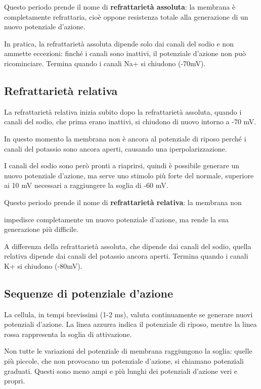 \documentclass[12pt,a4paper,openany]{book}
\begin{document}
Questo periodo prende il nome di \textbf{refrattarietà assoluta}: la membrana è completamente refrattaria, cioè oppone resistenza totale alla generazione di un nuovo potenziale d'azione.

In pratica, la refrattarietà assoluta dipende solo dai canali del sodio e non ammette eccezioni: finché i canali sono inattivi, il potenziale d'azione non può ricominciare. Termina quando i canali Na+ si chiudono (-70mV).


\subsection{Refrattarietà relativa}

La refrattarietà relativa inizia subito dopo la refrattarietà assoluta, quando i canali del sodio, che prima erano inattivi, si chiudono di nuovo intorno a -70 mV.

In questo momento la membrana non è ancora al potenziale di riposo perché i canali del potassio sono ancora aperti, causando una iperpolarizzazione.

I canali del sodio sono però pronti a riaprirsi, quindi è possibile generare un nuovo potenziale d'azione, ma serve uno stimolo più forte del normale, superiore ai 10 mV necessari a raggiungere la soglia di -60 mV.

Questo periodo prende il nome di \textbf{refrattarietà relativa}: la membrana non

impedisce completamente un nuovo potenziale d'azione, ma rende la sua generazione più difficile.

A differenza della refrattarietà assoluta, che dipende dai canali del sodio, quella relativa dipende dai canali del potassio ancora aperti. Termina quando i canali K+ si chiudono (-80mV).


\subsection{Sequenze di potenziale d'azione}

La cellula, in tempi brevissimi (1-2 ms), valuta continuamente se generare nuovi potenziali d'azione. La linea azzurra indica il potenziale di riposo, mentre la linea rossa rappresenta la soglia di attivazione.

Non tutte le variazioni del potenziale di membrana raggiungono la soglia: quelle più piccole, che non provocano un potenziale d'azione, si chiamano potenziali graduati. Questi sono meno ampi e più lunghi dei potenziali d'azione veri e propri.
\end{document}
